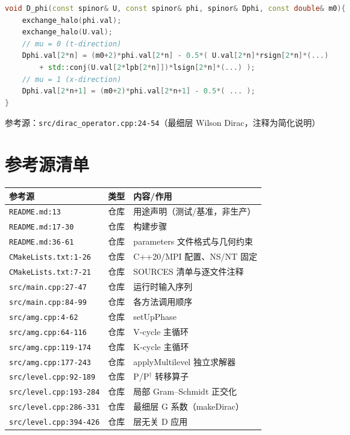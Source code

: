 \documentclass[UTF8]{ctexart}
\begin{document}
\begin{lstlisting}[language=C++]
void D_phi(const spinor& U, const spinor& phi, spinor& Dphi, const double& m0){
	exchange_halo(phi.val);
	exchange_halo(U.val);
	// mu = 0 (t-direction)
	Dphi.val[2*n] = (m0+2)*phi.val[2*n] - 0.5*( U.val[2*n]*rsign[2*n]*(...)
		+ std::conj(U.val[2*lpb[2*n]])*lsign[2*n]*(...) );
	// mu = 1 (x-direction)
	Dphi.val[2*n+1] = (m0+2)*phi.val[2*n+1] - 0.5*( ... );
}
\end{lstlisting}
参考源：\texttt{\nolinkurl{src/dirac_operator.cpp:24-54}}（最细层 Wilson Dirac，注释为简化说明）

\section{参考源清单}
\begin{xltabular}{\textwidth}{lXX}
\toprule
\textcolor{evidence}{参考源} & 类型 & 内容/作用 \\
\midrule
\endhead
\texttt{\nolinkurl{README.md:13}} & 仓库 & 用途声明（测试/基准，非生产）\\
\texttt{\nolinkurl{README.md:17-30}} & 仓库 & 构建步骤 \\
\texttt{\nolinkurl{README.md:36-61}} & 仓库 & parameters 文件格式与几何约束 \\
\texttt{\nolinkurl{CMakeLists.txt:1-26}} & 仓库 & C++20/MPI 配置、NS/NT 固定 \\
\texttt{\nolinkurl{CMakeLists.txt:7-21}} & 仓库 & SOURCES 清单与逐文件注释 \\
\texttt{\nolinkurl{src/main.cpp:27-47}} & 仓库 & 运行时输入序列 \\
\texttt{\nolinkurl{src/main.cpp:84-99}} & 仓库 & 各方法调用顺序 \\
\texttt{\nolinkurl{src/amg.cpp:4-62}} & 仓库 & setUpPhase \\
\texttt{\nolinkurl{src/amg.cpp:64-116}} & 仓库 & V-cycle 主循环 \\
\texttt{\nolinkurl{src/amg.cpp:119-174}} & 仓库 & K-cycle 主循环 \\
\texttt{\nolinkurl{src/amg.cpp:177-243}} & 仓库 & applyMultilevel 独立求解器 \\
\texttt{\nolinkurl{src/level.cpp:92-189}} & 仓库 & P/P$^\dagger$ 转移算子 \\
\texttt{\nolinkurl{src/level.cpp:193-284}} & 仓库 & 局部 Gram--Schmidt 正交化 \\
\texttt{\nolinkurl{src/level.cpp:286-331}} & 仓库 & 最细层 G 系数（makeDirac）\\
\texttt{\nolinkurl{src/level.cpp:394-426}} & 仓库 & 层无关 D 应用 \\

\end{xltabular}
\end{document}
